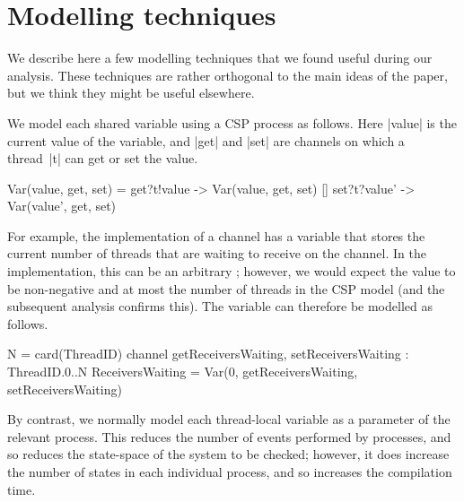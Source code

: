 \section{Modelling techniques}
\label{app:modelling}

\inlineCSP

We describe here a few modelling techniques that we found useful during our
analysis.  These techniques are rather orthogonal to the main ideas of the
paper, but we think they might be useful elsewhere. 

We model each shared variable using a CSP process as follows.  Here |value| is
the current value of the variable, and |get| and |set| are channels on which a
thread~|t| can get or set the value.
%
\begin{cspm}
Var(value, get, set) = 
  get?t!value -> Var(value, get, set)
  [] set?t?value' -> Var(value', get, set)
\end{cspm}
%
For example, the implementation of a channel has a variable
 that stores the current number of threads that are
waiting to receive on the channel.  In the implementation, this can be an
arbitrary ; however, we would expect the value to be non-negative
and at most the number of threads in the CSP model (and the subsequent
analysis confirms this).  The variable can therefore be modelled as follows. 
%
\begin{cspm}
N = card(ThreadID)
channel getReceiversWaiting, setReceiversWaiting : ThreadID.{0..N}
ReceiversWaiting = Var(0, getReceiversWaiting, setReceiversWaiting)
\end{cspm}

By contrast, we normally model each thread-local variable as a parameter of
the relevant process.  This reduces the number of events performed by
processes, and so reduces the state-space of the system to be checked;
however, it does increase the number of states in each individual process, and
so increases the compilation time. 

